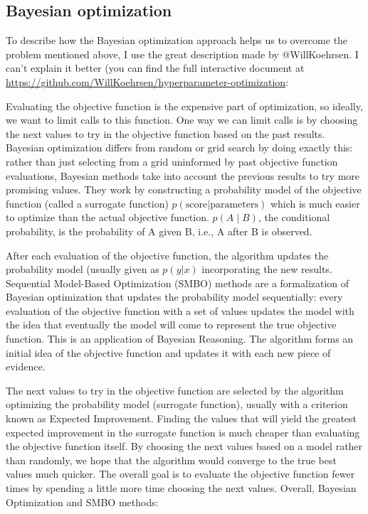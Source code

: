 \begin{subappendices}
\subsection{Bayesian optimization}

To describe how the Bayesian optimization approach helps us to overcome the problem mentioned above, I use the great description made by @WillKoehrsen. I can't explain it better (you can find the full interactive document at \url{https://github.com/WillKoehrsen/hyperparameter-optimization}:

\begin{itshape}
Evaluating the objective function is the expensive part of optimization, so ideally, we want to limit calls to this function. One way we can limit calls is by choosing the next values to try in the objective function based on the past results. Bayesian optimization differs from random or grid search by doing exactly this: rather than just selecting from a grid uninformed by past objective function evaluations, Bayesian methods take into account the previous results to try more promising values. They work by constructing a probability model of the objective function (called a surrogate function) $p(\text{score} | \text{parameters})$ which is much easier to optimize than the actual objective function. $p (A\mid B)$, the conditional probability, is the probability of A given B, i.e., A after B is observed.

After each evaluation of the objective function, the algorithm updates the probability model (usually given as $p(y | x)$ incorporating the new results. Sequential Model-Based Optimization (SMBO) methods are a formalization of Bayesian optimization that updates the probability model sequentially: every evaluation of the objective function with a set of values updates the model with the idea that eventually the model will come to represent the true objective function. This is an application of Bayesian Reasoning. The algorithm forms an initial idea of the objective function and updates it with each new piece of evidence.

The next values to try in the objective function are selected by the algorithm optimizing the probability model (surrogate function), usually with a criterion known as Expected Improvement. Finding the values that will yield the greatest expected improvement in the surrogate function is much cheaper than evaluating the objective function itself. By choosing the next values based on a model rather than randomly, we hope that the algorithm would converge to the true best values much quicker. The overall goal is to evaluate the objective function fewer times by spending a little more time choosing the next values. Overall, Bayesian Optimization and SMBO methods:


\end{itshape}
\end{subappendices}
